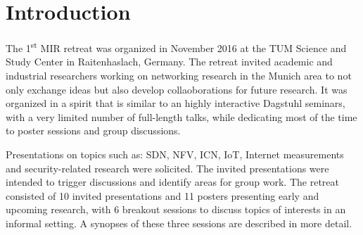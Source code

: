 \section{Introduction}\label{sec:introduction}


The 1\textsuperscript{st} \ac{MIR} retreat was organized in November 2016 at
the TUM Science and Study Center in Raitenhaslach, Germany.  The retreat
invited academic and industrial researchers working on networking research in
the Munich area to not only exchange ideas but also develop collaoborations
for future research.  It was organized in a spirit that is similar to an
highly interactive Dagstuhl seminars, with a very limited number of
full-length talks, while dedicating most of the time to poster sessions and
group discussions.

Presentations on topics such as: \ac{SDN}, \ac{NFV}, \ac{ICN}, \ac{IoT},
Internet measurements and security-related research were solicited. The
invited presentations were intended to trigger discussions and identify areas
for group work. The retreat consisted of 10 invited presentations and 11
posters presenting early and upcoming research, with 6 breakout sessions to
discuss topics of interests in an informal setting. A synopses of these three
sessions are described in more detail.
